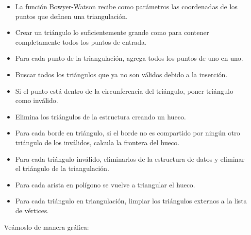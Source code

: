 \begin{itemize} 
    \item La función Bowyer-Watson recibe como parámetros las coordenadas de los puntos que definen una triangulación.
    \item Crear un triángulo lo suficientemente grande como para contener completamente todos los puntos de entrada.
    \item Para cada punto de la triangulación, agrega todos los puntos de uno en uno.
    \item Buscar todos los triángulos que ya no son válidos debido a la inserción.
    \item Si el punto está dentro de la circunferencia del triángulo, poner triángulo como inválido.
    \item Elimina los triángulos de la estructura creando un hueco.
    \item Para cada borde en triángulo, si el borde no es compartido por ningún otro triángulo de los inválidos, calcula la frontera del hueco.
    \item Para cada triángulo inválido, eliminarlos de la estructura de datos y eliminar el triángulo de la triangulación.
    \item Para cada arista en polígono se vuelve a triangular el hueco.
    \item Para cada triángulo en triangulación, limpiar los triángulos externos a la lista de vértices.
\end{itemize}
      
      
Veámoslo de manera gráfica: 

